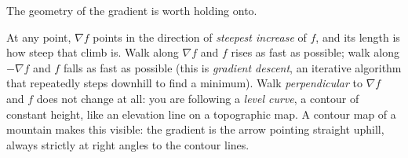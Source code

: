 The geometry of the gradient is worth holding onto.

\begin{intuitionbox}
At any point, $\nabla f$ points in the direction of \emph{steepest increase} of $f$, and its length
is how steep that climb is. Walk along $\nabla f$ and $f$ rises as fast as possible; walk along
$-\nabla f$ and $f$ falls as fast as possible (this is \emph{gradient descent}, an iterative
algorithm that repeatedly steps downhill to find a minimum). Walk \emph{perpendicular} to $\nabla f$
and $f$ does not change at all: you are following a \emph{level curve}, a contour of constant height,
like an elevation line on a topographic map. A contour map of a mountain makes this visible: the
gradient is the arrow pointing straight uphill, always strictly at right angles to the contour lines.
\end{intuitionbox}

